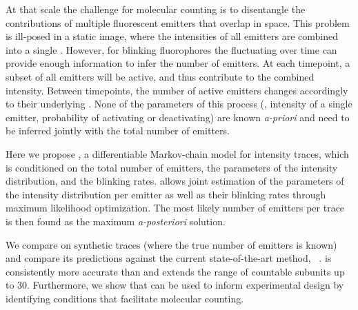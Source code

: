 %
At that scale the challenge for molecular counting is to disentangle the contributions
of multiple fluorescent emitters that overlap in space.
%
  This problem is ill-posed in a static image, where the intensities of all
  emitters are combined into a single . However, for blinking fluorophores the
  fluctuating  over time can provide enough
  information to infer the number of emitters.
  At each timepoint, a subset of all emitters will be active, and thus
  contribute to the combined intensity. Between timepoints, the number of
  active emitters changes accordingly to their underlying .
  None of the parameters of this process (\eg, intensity of a single emitter,
  probability of activating or deactivating) are known \emph{a-priori} and need
  to be inferred jointly with the total number of emitters.

Here we propose \ours, a differentiable Markov-chain model for intensity
traces, which is conditioned on the total number of emitters, the parameters of
the intensity distribution, and the blinking rates.
%
  \ours allows joint estimation of the parameters of the intensity distribution
  per emitter as well as their blinking rates through maximum likelihood
  optimization.
  The most likely number of emitters per trace is then found as the maximum
  \emph{a-posteriori} solution.

We compare \ours on synthetic traces (where the true number of emitters is
known) and compare its predictions against the current state-of-the-art method,
\lbfcs~\citep{stein_calibration-free_2021}.
%
  \ours is consistently more accurate than \lbfcs and extends the range of
  countable subunits up to 30.
  Furthermore, we show that \ours can be used to inform experimental design by
  identifying conditions that facilitate molecular counting.

